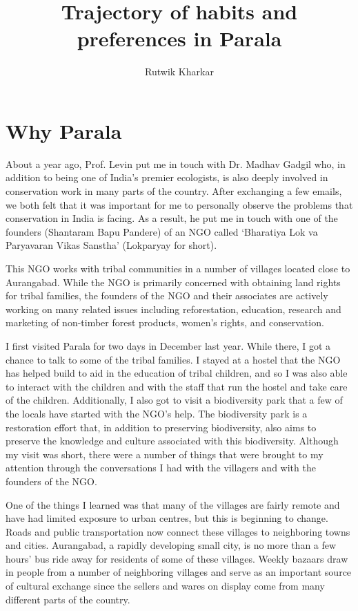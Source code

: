 \documentclass{article}
\title{Trajectory of habits and preferences in Parala}
\author{Rutwik Kharkar}
\begin{document}
\maketitle

\section{Why Parala}

About a year ago, Prof. Levin put me in touch with Dr. Madhav Gadgil who, in addition to being one of India's premier ecologists, is also deeply involved in conservation work in many parts of the country. After exchanging a few emails, we both felt that it was important for me to personally observe the problems that conservation in India is facing. As a result, he put me in touch with one of the founders (Shantaram Bapu Pandere) of an NGO called `Bharatiya Lok va Paryavaran Vikas Sanstha' (Lokparyay for short).

This NGO works with tribal communities in a number of villages located close to Aurangabad. While the NGO is primarily concerned with obtaining land rights for tribal families, the founders of the NGO and their associates are actively working on many related issues including reforestation, education, research and marketing of non-timber forest products, women's rights, and conservation.

I first visited Parala for two days in December last year. While there, I got a chance to talk to some of the tribal families. I stayed at a hostel that the NGO has helped build to aid in the education of tribal children, and so I was also able to interact with the children and with the staff that run the hostel and take care of the children. Additionally, I also got to visit a biodiversity park that a few of the locals have started with the NGO's help. The biodiversity park is a restoration effort that, in addition to preserving biodiversity, also aims to preserve the knowledge and culture associated with this biodiversity. Although my visit was short, there were a number of things that were brought to my attention through the conversations I had with the villagers and with the founders of the NGO.

One of the things I learned was that many of the villages are fairly remote and have had limited exposure to urban centres, but this is beginning to change. Roads and public transportation now connect these villages to neighboring towns and cities. Aurangabad, a rapidly developing small city, is no more than a few hours' bus ride away for residents of some of these villages. Weekly bazaars draw in people from a number of neighboring villages and serve as an important source of cultural exchange since the sellers and wares on display come from many different parts of the country.
\end{document}

